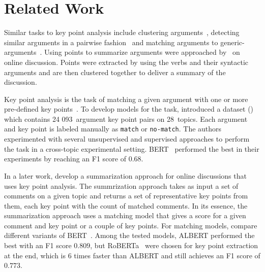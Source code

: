 \section{Related Work}\label{related-work}





Similar tasks to key point analysis include clustering arguments~\cite{reimers2019classification,ajjour2019modeling}, detecting similar arguments in a pairwise fashion~\cite{misra:2016} and matching arguments to generic-arguments~\cite{naderi:2017}. Using points to summarize arguments were approached by~\citet{egan2016summarising} on online discussion. Points were extracted by using the verbs and their syntactic arguments and are then clustered together to deliver a summary of the discussion. 

Key point analysis is the task of matching a given argument with one or more pre-defined key points~\cite{Bar-HaimEFKLS2020}. To develop models for the task, \citet{Bar-HaimEFKLS2020} introduced a dataset (\ArgKP) which contains 24 093~argument key point pairs on 28~topics. Each argument and key point is labeled manually as \texttt{match} or \texttt{no-match}. The authors experimented with several unsupervised and supervised approaches to perform the task in a cross-topic experimental setting. BERT~\cite{DevlinCLT2019} performed the best in their experiments by reaching an F1 score of $0.68$.

In a later work, \citet{Bar-HaimKEFLS2020} develop a summarization approach for online discussions that
uses key point analysis. The summrization approach takes as input a set of comments on a given topic and returns a set of representative key points from them, each key point with the count of matched comments. In its essence, the summarization approach uses a matching model that gives a score for a given comment and key point or a couple of key points. For matching models, \citet{Bar-HaimKEFLS2020} compare different variants of BERT~\cite{DevlinCLT2019}. Among the tested models,
ALBERT \cite{lan2019albert} performed the best with an F1 score $0.809$, but RoBERTa~\cite{LiuOGDJCLLZS2019} were chosen for key point extraction at the end, which is 6 times faster than ALBERT and still achieves an F1 score of $0.773$. 

